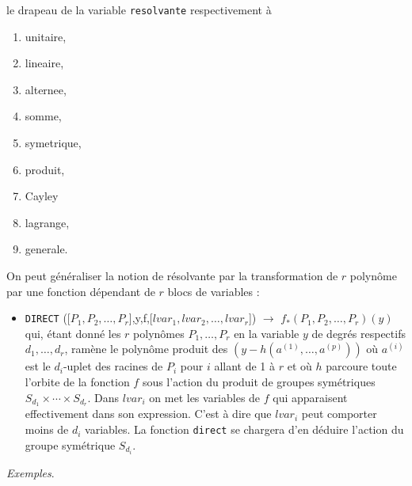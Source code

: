 le drapeau de la variable {\tt resolvante} respectivement \`a 
\begin{enumerate}
\item unitaire,
\item lineaire,
\item alternee,
\item somme,
\item symetrique,
\item produit,
\item Cayley
\item lagrange,
\item generale.
\end{enumerate}
On peut g\'en\'eraliser la notion de r\'esolvante par la
transformation de $r$ polyn\^ome par une fonction d\'ependant de
$r$ blocs de variables :
\begin{itemize}
\item {\tt DIRECT} 
      ([$P_1,P_2,\ldots,P_r$],y,f,[$lvar_1,lvar_2,\ldots ,lvar_r$])
$\longrightarrow$ $f_*(P_1,P_2, \ldots, P_r)(y)$ \\
qui, \'etant donn\'e les $r$ polyn\^omes $P_1, \ldots, P_r$ en la variable
$y$ de 
degr\'es respectifs $d_1, \ldots , d_r$, ram\`ene
le polyn\^ome produit des $(y - h(a^{(1)}, \ldots, a^{(p)}))$ o\`u
$a^{(i)}$ est le $d_i$-uplet des racines de $P_i$ pour $i$ allant de 1
\`a $r$ et o\`u $h$ parcoure toute l'orbite de la fonction $f$ sous 
l'action du produit de groupes sym\'etriques
$S_{d_1}\times \cdots \times S_{d_r}$. Dans $lvar_i$ on met les variables
de $f$ qui apparaisent effectivement dans son expression. C'est \`a dire
que $lvar_i$ peut comporter moins de $d_i$ variables. La fonction
{\tt direct} se chargera d'en d\'eduire l'action du groupe
sym\'etrique $S_{d_i}$.
\end{itemize}
{\it Exemples}.
\small
